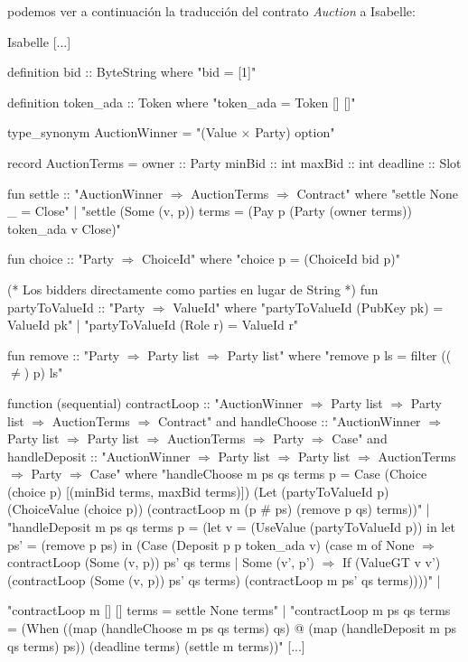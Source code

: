 \documentclass[12pt]{book}
\begin{document}
podemos ver a continuación la traducción del contrato \textit{Auction} a Isabelle:

\newpage
\begin{code}[title=Contracto \textit{Auction} traducido a Isabelle.]{Isabelle}
[...]

definition bid :: ByteString where
"bid = [1]"

definition token_ada :: Token where
"token_ada = Token [] []"

type_synonym AuctionWinner = "(Value $\times$ Party) option"

record AuctionTerms = owner :: Party
                      minBid :: int
                      maxBid :: int
                      deadline :: Slot

fun settle :: "AuctionWinner $\Rightarrow$ AuctionTerms $\Rightarrow$ Contract" where
  "settle None _ = Close" |
  "settle (Some (v, p)) terms = (Pay p (Party (owner terms)) 
                                     token_ada v Close)"

fun choice :: "Party $\Rightarrow$ ChoiceId" where
  "choice p = (ChoiceId bid p)"

(* Los bidders directamente como parties en lugar de String *)
fun partyToValueId :: "Party $\Rightarrow$ ValueId" where
  "partyToValueId (PubKey pk) = ValueId pk" | 
  "partyToValueId (Role r) = ValueId r"

fun remove :: "Party $\Rightarrow$ Party list $\Rightarrow$ Party list" where
"remove p ls = filter (($\neq$) p) ls"

function (sequential) contractLoop :: "AuctionWinner $\Rightarrow$ Party list $\Rightarrow$ Party list $\Rightarrow$ AuctionTerms $\Rightarrow$ Contract"
and handleChoose :: "AuctionWinner $\Rightarrow$ Party list $\Rightarrow$ Party list $\Rightarrow$ AuctionTerms $\Rightarrow$ Party $\Rightarrow$ Case"
and handleDeposit :: "AuctionWinner $\Rightarrow$ Party list $\Rightarrow$ Party list $\Rightarrow$ AuctionTerms $\Rightarrow$ Party $\Rightarrow$ Case" 
where
"handleChoose m ps qs terms p = 
                Case (Choice (choice p) [(minBid terms, maxBid terms)])
                     (Let (partyToValueId p)
                     (ChoiceValue (choice p))
                     (contractLoop m (p # ps) (remove p qs) terms))" |
"handleDeposit m ps qs terms p = 
   (let v = (UseValue (partyToValueId p)) in
    let ps' = (remove p ps) in
    (Case (Deposit p p token_ada v)
          (case m of
              None          $\Rightarrow$ contractLoop (Some (v, p)) ps' qs terms
            | Some (v', p') $\Rightarrow$ If (ValueGT v v') 
                                  (contractLoop (Some (v, p)) ps' qs terms) 
                                  (contractLoop m ps' qs terms))))" |

"contractLoop m [] [] terms = 
                settle None terms" |
"contractLoop m ps qs terms = 
                (When ((map (handleChoose m ps qs terms) qs) @ 
                       (map (handleDeposit m ps qs terms) ps)) 
                      (deadline terms)
                      (settle m terms))"  
  [...]
\end{code}
\end{document}

